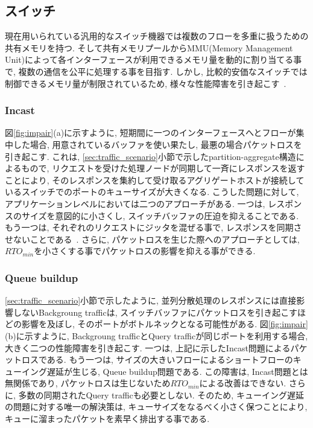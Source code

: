 \documentclass[10pt, a4paper, twocolumn]{jsarticle}
\begin{document}
\subsection{スイッチ}
\label{sec:switch}
現在用いられている汎用的なスイッチ機器では複数のフローを多重に扱うための共有メモリを持つ.
そして共有メモリプールからMMU(Memory Management Unit)によって各インターフェースが利用できるメモリ量を動的に割り当てる事で,
複数の通信を公平に処理する事を目指す.
しかし, 比較的安価なスイッチでは制御できるメモリ量が制限されているため,
様々な性能障害を引き起こす~\cite{flexible}.

\subsubsection{Incast}
\label{subsec:incast}
図\ref{fig:impair}(a)に示すように, 短期間に一つのインターフェースへとフローが集中した場合, 用意されているバッファを使い果たし,
最悪の場合パケットロスを引き起こす.
これは, \ref{sec:traffic_scenario}小節で示したpartition-aggregate構造によるもので,
リクエストを受けた処理ノードが同期して一斉にレスポンスを返すことにより,
そのレスポンスを集約して受け取るアグリゲートホストが接続しているスイッチでのポートのキューサイズが大きくなる.
こうした問題に対して, アプリケーションレベルにおいては二つのアプローチがある.
一つは, レスポンスのサイズを意図的に小さくし, スイッチバッファの圧迫を抑えることである.
もう一つは, それぞれのリクエストにジッタを混ぜる事で, レスポンスを同期させないことである~\cite{synchro}.
さらに, パケットロスを生じた際へのアプローチとしては, $RTO_{min}$を小さくする事でパケットロスの影響を抑える事ができる.

\subsubsection{Queue buildup}
\label{subsec:queue}
\ref{sec:traffic_scenario}小節で示したように, 並列分散処理のレスポンスには直接影響しないBackgroung trafficは,
スイッチバッファにパケットロスを引き起こすほどの影響を及ぼし, そのポートがボトルネックとなる可能性がある.
図\ref{fig:impair}(b)に示すように, Backgroung trafficとQuery trafficが同じポートを利用する場合,
大きく二つの性能障害を引き起こす.
一つは, 上記に示したIncast問題によるパケットロスである.
もう一つは, サイズの大きいフローによるショートフローのキューイング遅延が生じる, Queue buildup問題である.
この障害は, Incast問題とは無関係であり, パケットロスは生じないため$RTO_{min}$による改善はできない.
さらに, 多数の同期されたQuery trafficも必要としない.
そのため, キューイング遅延の問題に対する唯一の解決策は, キューサイズをなるべく小さく保つことにより, キューに溜まったパケットを素早く排出する事である.
\end{document}

